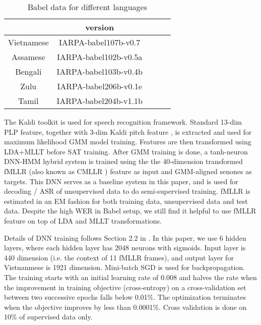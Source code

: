 \documentclass[a4paper]{article}
\begin{document}
\begin{table}[htb]
  \centering
  \begin{tabular}{ccccc}
    \hline
              & version  \\
    \hline
    Vietnamese & IARPA-babel107b-v0.7   \\
    Assamese   & IARPA-babel102b-v0.5a  \\
    Bengali    & IARPA-babel103b-v0.4b \\
    Zulu       & IARPA-babel206b-v0.1e  \\
    Tamil      & IARPA-babel204b-v1.1b  \\
    \hline
  \end{tabular}
  \caption{Babel data for different languages}
  \label{tab:version}
\end{table}

The Kaldi toolkit\cite{kaldi11} is used for speech recognition framework. Standard 13-dim PLP feature, 
together with 3-dim Kaldi pitch feature \cite{ghahremani2014pitch}, is extracted and used for maximum 
likelihood GMM model training. Features are then transformed using LDA+MLLT before SAT training. 
After GMM training is done, a tanh-neuron DNN-HMM hybrid system is trained using 
the the 40-dimension transformed fMLLR (also known as CMLLR \cite{gales1996generation}) feature as input 
and GMM-aligned senones as targets. This DNN serves as a baseline system in this paper, and is used for 
decoding / ASR of unsupervised data to do semi-supervised training. fMLLR is estimated in an EM fashion
for both training data, unsupervised data and test data. Despite the high WER in Babel setup, we still
find it helpful to use fMLLR feature on top of LDA and MLLT transformations.

Details of DNN training follows Section 2.2 in \cite{vesely13}. 
In this paper, we use 6 hidden layers, where each hidden layer has 2048 neurons with sigmoids. Input layer
is 440 dimension (i.e. the context of 11 fMLLR frames), and output layer for Vietnanmese is 1921 dimension.
Mini-batch SGD is used for backpropagation. The training starts with an initial learning rate of 0.008 and halves the
rate when the improvement in training objective (cross-entropy) on a cross-validation set between two successive 
epochs falls below 0.01\%. The optimization terminates when the objective improves by less than 0.0001\%.
Cross validation is done on 10\% of supervised data only.
\end{document}
